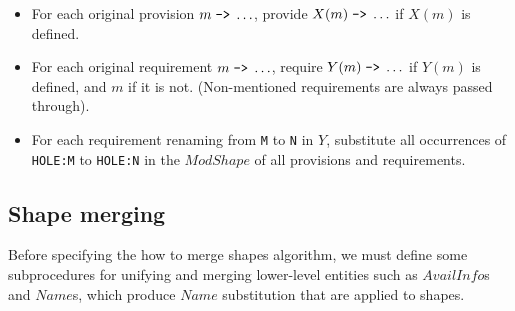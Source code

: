 \documentclass{article}
\newcommand{\I}[1]{\ensuremath{\mathit{#1}}}
\begin{document}
\begin{itemize}
    \item For each original provision $m\; \verb|->|\; \ldots$, provide
          $X (m)\; \verb|->|\; \ldots$ if $X (m)$ is defined.
    \item For each original requirement $m\; \verb|->|\; \ldots$, require
          $Y (m)\; \verb|->|\; \ldots$ if $Y (m)$ is defined, and $m$ if it is not.
          (Non-mentioned requirements are always passed through).
    \item For each requirement renaming from \verb|M| to \verb|N| in $Y$, substitute
          all occurrences of \verb|HOLE:M| to \verb|HOLE:N| in the \I{ModShape}
          of all provisions and requirements.
\end{itemize}

\subsection{Shape merging}
Before specifying the how to merge shapes algorithm, we must define some subprocedures
for unifying and merging lower-level entities such as \I{AvailInfo}s and \I{Name}s,
which produce \I{Name} substitution that are applied to shapes.
\end{document}
